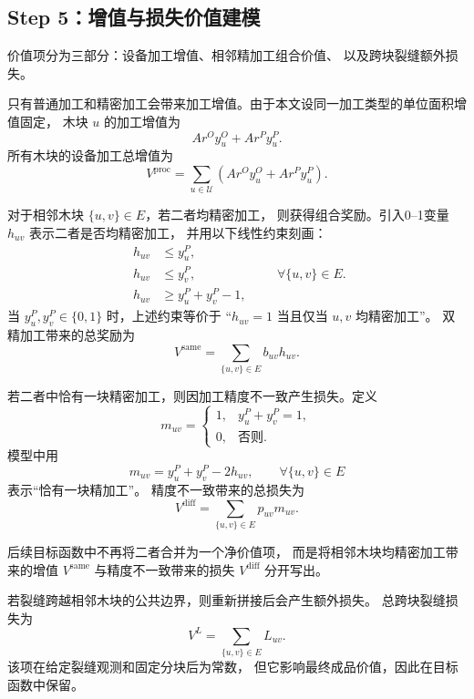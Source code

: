 ﻿\documentclass[UTF8,12pt,a4paper]{ctexart}
\begin{document}
\subsection{Step 5：增值与损失价值建模}

价值项分为三部分：设备加工增值、相邻精加工组合价值、
以及跨块裂缝额外损失。

\begin{description}[leftmargin=2em,labelsep=0.5em,itemsep=0.8em]
  \item[\textbf{（1）设备加工增值：}]
只有普通加工和精密加工会带来加工增值。由于本文设同一加工类型的单位面积增值固定，
木块 \(u\) 的加工增值为
\[
A r^O y_u^O+A r^P y_u^P.
\]
所有木块的设备加工总增值为
\[
\boxed{
V^{\mathrm{proc}}
=
\sum_{u\in\mathcal U}
\left(
A r^O y_u^O+A r^P y_u^P
\right).
}
\]

  \item[\textbf{（2）相邻加工状态带来的奖励与损失：}]
对于相邻木块 \(\{u,v\}\in E\)，若二者均精密加工，
则获得组合奖励。引入0--1变量 \(h_{uv}\) 表示二者是否均精密加工，
并用以下线性约束刻画：
\[
\begin{aligned}
h_{uv}&\le y_u^P,\\
h_{uv}&\le y_v^P,\\
h_{uv}&\ge y_u^P+y_v^P-1,
\end{aligned}
\qquad
\forall\{u,v\}\in E.
\]
当 \(y_u^P,y_v^P\in\{0,1\}\) 时，上述约束等价于
“\(h_{uv}=1\) 当且仅当 \(u,v\) 均精密加工”。
双精加工带来的总奖励为
\[
\boxed{
V^{\mathrm{same}}
=
\sum_{\{u,v\}\in E}b_{uv}h_{uv}.
}
\]

若二者中恰有一块精密加工，则因加工精度不一致产生损失。定义
\[
m_{uv}=
\begin{cases}
1, & y_u^P+y_v^P=1,\\
0, & \text{否则}.
\end{cases}
\]
模型中用
\[
\boxed{
m_{uv}=y_u^P+y_v^P-2h_{uv},
\qquad
\forall\{u,v\}\in E
}
\]
表示“恰有一块精加工”。
精度不一致带来的总损失为
\[
\boxed{
V^{\mathrm{diff}}
=
\sum_{\{u,v\}\in E}p_{uv}m_{uv}.
}
\]

后续目标函数中不再将二者合并为一个净价值项，
而是将相邻木块均精密加工带来的增值 \(V^{\mathrm{same}}\)
与精度不一致带来的损失 \(V^{\mathrm{diff}}\) 分开写出。

  \item[\textbf{（3）跨块裂缝额外损失：}]
若裂缝跨越相邻木块的公共边界，则重新拼接后会产生额外损失。
总跨块裂缝损失为
\[
\boxed{
V^L
=
\sum_{\{u,v\}\in E}
L_{uv}.
}
\]
该项在给定裂缝观测和固定分块后为常数，
但它影响最终成品价值，因此在目标函数中保留。
\end{description}
\end{document}
